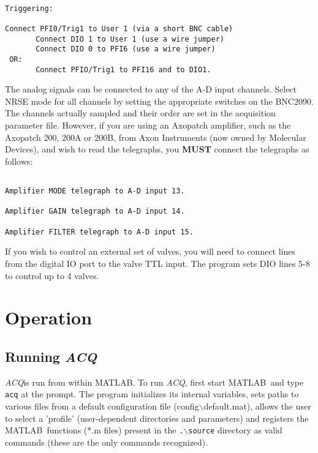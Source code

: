 \documentclass[11pt, letterpaper, titlepage]{paper}
\newcommand{\acq}{\textsl{ACQ}}
\newcommand{\ml}{\textsf{MATLAB}}
\begin{document}
\begin{verbatim}

Triggering:

Connect PFI0/Trig1 to User 1 (via a short BNC cable)
       Connect DIO 1 to User 1 (use a wire jumper)
       Connect DIO 0 to PFI6 (use a wire jumper)
 OR:
       Connect PFIO/Trig1 to PFI16 and to DIO1.

\end{verbatim}


The analog signals can be connected to any of the A-D input channels. 
Select NRSE mode for all channels by setting the appropriate switches on the BNC2090. The channels actually sampled 
and their order are set in the acquisition parameter file. 
However, if you are using an Axopatch amplifier, such as the Axopatch 200, 200A or 200B, from Axon 
Instruments (now owned by Molecular Devices), and wish to read the telegraphs, you \textbf{MUST} 
connect the telegraphs as follows:

\begin {verbatim}

Amplifier MODE telegraph to A-D input 13.

Amplifier GAIN telegraph to A-D input 14.

Amplifier FILTER telegraph to A-D input 15.

\end{verbatim}


If you wish to control an external set of valves, you will need to 
connect lines from the digital IO port to the valve TTL input. The 
program sets DIO lines 5-8 to control up to 4 valves.

\section{Operation}

\subsection{Running \acq}
 \acq is run from within \ml. To run \acq, 
first start \ml\ and type \texttt{acq} at the prompt. The program 
initializes its internal variables, sets paths to various files 
from a default configuration file (config$\backslash$default.mat), allows the user 
to select a 'profile' (user-dependent directories and parameters) 
and registers the \ml\ functions (*.m files) present in the 
\texttt{.$\backslash$source} directory as valid commands (these 
are the only commands recognized).
\end{document}
